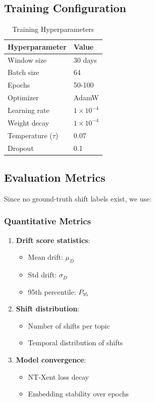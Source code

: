 \documentclass[12pt]{article}
\begin{document}
\subsection{Training Configuration}

\begin{table}[H]
\centering
\begin{tabular}{ll}
\toprule
\textbf{Hyperparameter} & \textbf{Value} \\
\midrule
Window size & 30 days \\
Batch size & 64 \\
Epochs & 50-100 \\
Optimizer & AdamW \\
Learning rate & $1 \times 10^{-4}$ \\
Weight decay & $1 \times 10^{-4}$ \\
Temperature ($\tau$) & 0.07 \\
Dropout & 0.1 \\
\bottomrule
\end{tabular}
\caption{Training Hyperparameters}
\end{table}

\subsection{Evaluation Metrics}

Since no ground-truth shift labels exist, we use:

\subsubsection{Quantitative Metrics}

\begin{enumerate}
    \item \textbf{Drift score statistics}:
    \begin{itemize}
        \item Mean drift: $\mu_D$
        \item Std drift: $\sigma_D$
        \item 95th percentile: $P_{95}$
    \end{itemize}
    
    \item \textbf{Shift distribution}:
    \begin{itemize}
        \item Number of shifts per topic
        \item Temporal distribution of shifts
    \end{itemize}
    
    \item \textbf{Model convergence}:
    \begin{itemize}
        \item NT-Xent loss decay
        \item Embedding stability over epochs
    \end{itemize}
\end{enumerate}
\end{document}
